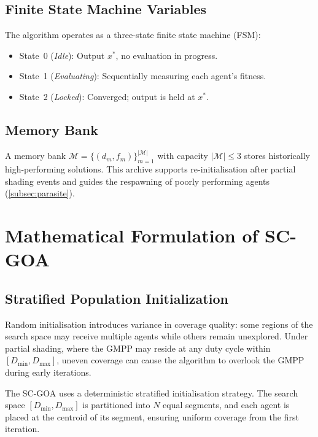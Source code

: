 \documentclass[a4paper, 12pt]{article}
\begin{document}
\subsection{Finite State Machine Variables}

The algorithm operates as a three-state finite state machine (FSM):
\begin{itemize}[leftmargin=2cm]
    \item State~0 (\textit{Idle}): Output $x^{*}$, no evaluation in progress.
    \item State~1 (\textit{Evaluating}): Sequentially measuring each agent's fitness.
    \item State~2 (\textit{Locked}): Converged; output is held at $x^{*}$.
\end{itemize}

\subsection{Memory Bank}

A memory bank $\mathcal{M} = \{(d_m, f_m)\}_{m=1}^{|\mathcal{M}|}$ with capacity $|\mathcal{M}| \leq 3$ stores historically high-performing solutions. This archive supports re-initialisation after partial shading events and guides the respawning of poorly performing agents (\cref{subsec:parasite}).


\section{Mathematical Formulation of SC-GOA}
\label{sec:formulation}

\subsection{Stratified Population Initialization}

Random initialisation introduces variance in coverage quality: some regions of the search space may receive multiple agents while others remain unexplored. Under partial shading, where the GMPP may reside at any duty cycle within $[D_{\min}, D_{\max}]$, uneven coverage can cause the algorithm to overlook the GMPP during early iterations.

The SC-GOA uses a deterministic stratified initialisation strategy. The search space $[D_{\min}, D_{\max}]$ is partitioned into $N$ equal segments, and each agent is placed at the centroid of its segment, ensuring uniform coverage from the first iteration.
\end{document}
